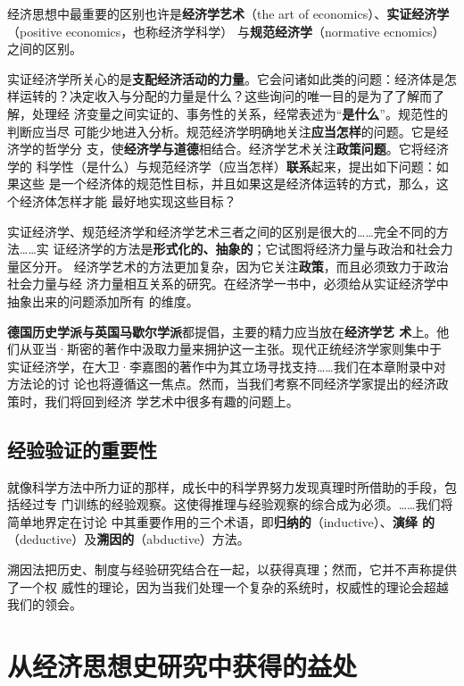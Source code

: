 经济思想中最重要的区别也许是\textbf{经济学艺术}（the art of
economics）、\textbf{实证经济学}（positive economics，也称经济学科学）
与\textbf{规范经济学}（normative ecnomics）之间的区别。

实证经济学所关心的是\textbf{支配经济活动的力量}。它会问诸如此类的问题：经济体是怎
样运转的？决定收入与分配的力量是什么？这些询问的唯一目的是为了了解而了解，处理经
济变量之间实证的、事务性的关系，经常表述为“\textbf{是什么}”。规范性的判断应当尽
可能少地进入分析。规范经济学明确地关注\textbf{应当怎样}的问题。它是经济学的哲学分
支，使\textbf{经济学与道德}相结合。经济学艺术关注\textbf{政策问题}。它将经济学的
科学性（是什么）与规范经济学（应当怎样）\textbf{联系}起来，提出如下问题：如果这些
是一个经济体的规范性目标，并且如果这是经济体运转的方式，那么，这个经济体怎样才能
最好地实现这些目标？

实证经济学、规范经济学和经济学艺术三者之间的区别是很大的……完全不同的方法……实
证经济学的方法是\textbf{形式化的、抽象的}；它试图将经济力量与政治和社会力量区分开。
经济学艺术的方法更加复杂，因为它关注\textbf{政策}，而且必须致力于政治社会力量与经
济力量相互关系的研究。在经济学一书中，必须给从实证经济学中抽象出来的问题添加所有
的维度。

\textbf{德国历史学派与英国马歇尔学派}都提倡，主要的精力应当放在\textbf{经济学艺
  术}上。他们从亚当·斯密的著作中汲取力量来拥护这一主张。现代正统经济学家则集中于
实证经济学，在大卫·李嘉图的著作中为其立场寻找支持……我们在本章附录中对方法论的讨
论也将遵循这一焦点。然而，当我们考察不同经济学家提出的经济政策时，我们将回到经济
学艺术中很多有趣的问题上。

\subsection{经验验证的重要性}

就像科学方法中所力证的那样，成长中的科学界努力发现真理时所借助的手段，包括经过专
门训练的经验观察。这使得推理与经验观察的综合成为必须。……我们将简单地界定在讨论
中其重要作用的三个术语，即\textbf{归纳的}（inductive）、\textbf{演绎
  的}（deductive）及\textbf{溯因的}（abductive）方法。

溯因法把历史、制度与经验研究结合在一起，以获得真理；然而，它并不声称提供了一个权
威性的理论，因为当我们处理一个复杂的系统时，权威性的理论会超越我们的领会。

\section{从经济思想史研究中获得的益处}

